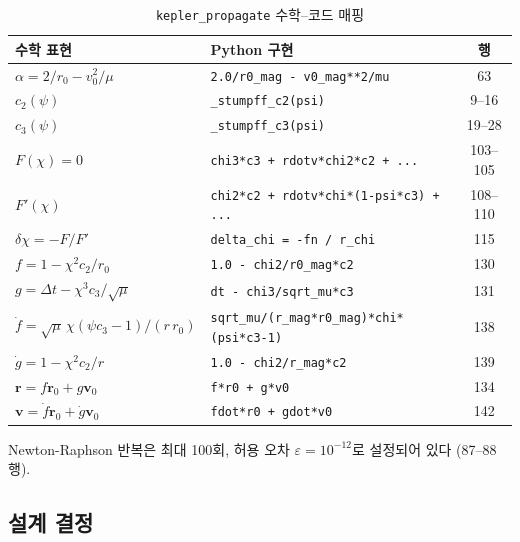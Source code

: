 \documentclass[11pt]{article}
\begin{document}
\begin{table}[htbp]
\centering
\caption{\texttt{kepler\_propagate} 수학--코드 매핑}
\label{tab:kepler_propagate_mapping}
\small
\begin{tabular}{@{}llc@{}}
\toprule
수학 표현 & Python 구현 & 행 \\
\midrule
$\alpha = 2/r_0 - v_0^2/\mu$ & \texttt{2.0/r0\_mag - v0\_mag**2/mu} & 63 \\
$c_2(\psi)$ & \texttt{\_stumpff\_c2(psi)} & 9--16 \\
$c_3(\psi)$ & \texttt{\_stumpff\_c3(psi)} & 19--28 \\
$F(\chi) = 0$ & \texttt{chi3*c3 + rdotv*chi2*c2 + ...} & 103--105 \\
$F'(\chi)$ & \texttt{chi2*c2 + rdotv*chi*(1-psi*c3) + ...} & 108--110 \\
$\delta\chi = -F/F'$ & \texttt{delta\_chi = -fn / r\_chi} & 115 \\
$f = 1 - \chi^2 c_2 / r_0$ & \texttt{1.0 - chi2/r0\_mag*c2} & 130 \\
$g = \Delta t - \chi^3 c_3 / \sqrt{\mu}$ & \texttt{dt - chi3/sqrt\_mu*c3} & 131 \\
$\dot{f} = \sqrt{\mu}\,\chi(\psi c_3 - 1)/(r\,r_0)$ & \texttt{sqrt\_mu/(r\_mag*r0\_mag)*chi*(psi*c3-1)} & 138 \\
$\dot{g} = 1 - \chi^2 c_2 / r$ & \texttt{1.0 - chi2/r\_mag*c2} & 139 \\
$\mathbf{r} = f\mathbf{r}_0 + g\mathbf{v}_0$ & \texttt{f*r0 + g*v0} & 134 \\
$\mathbf{v} = \dot{f}\mathbf{r}_0 + \dot{g}\mathbf{v}_0$ & \texttt{fdot*r0 + gdot*v0} & 142 \\
\bottomrule
\end{tabular}
\end{table}

Newton-Raphson 반복은 최대 100회, 허용 오차 $\varepsilon = 10^{-12}$로 설정되어 있다 (87--88행).


\subsection{설계 결정}
\label{sec:design_decisions}
\end{document}

